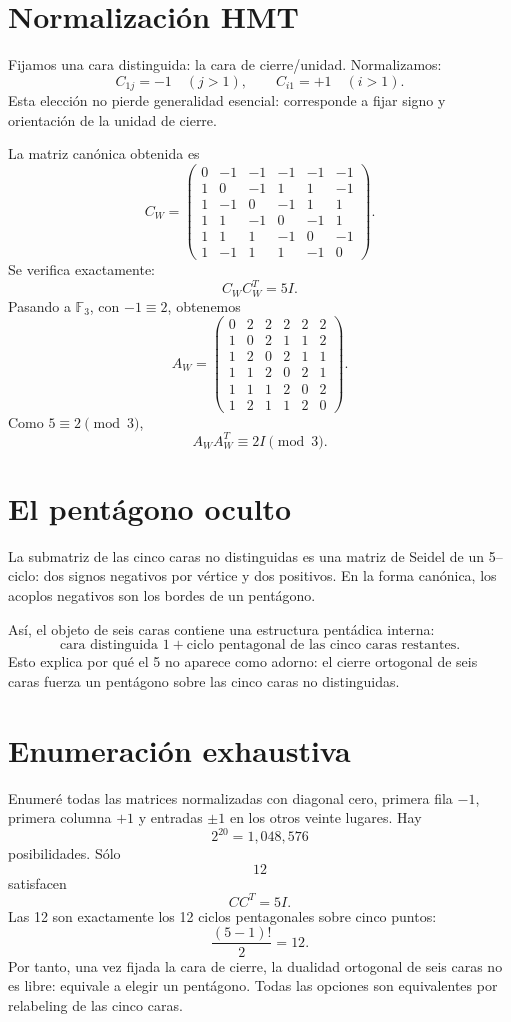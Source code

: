 \documentclass[11pt,a4paper]{article}
\newcommand{\F}{\mathbb F}
\begin{document}
\section{Normalización HMT}
Fijamos una cara distinguida: la cara de cierre/unidad. Normalizamos:
\[
C_{1j}=-1\quad(j>1),
\qquad
C_{i1}=+1\quad(i>1).
\]
Esta elección no pierde generalidad esencial: corresponde a fijar signo y orientación de la unidad de cierre.

La matriz canónica obtenida es
\[
C_W=
\begin{pmatrix}
0&-1&-1&-1&-1&-1\\
1&0&-1&1&1&-1\\
1&-1&0&-1&1&1\\
1&1&-1&0&-1&1\\
1&1&1&-1&0&-1\\
1&-1&1&1&-1&0
\end{pmatrix}.
\]
Se verifica exactamente:
\[
C_WC_W^T=5I.
\]
Pasando a \(\F_3\), con \(-1\equiv2\), obtenemos
\[
A_W=
\begin{pmatrix}
0&2&2&2&2&2\\
1&0&2&1&1&2\\
1&2&0&2&1&1\\
1&1&2&0&2&1\\
1&1&1&2&0&2\\
1&2&1&1&2&0
\end{pmatrix}.
\]
Como \(5\equiv2\pmod3\),
\[
\boxed{A_WA_W^T\equiv2I\pmod3.}
\]

\section{El pentágono oculto}
La submatriz de las cinco caras no distinguidas es una matriz de Seidel de un 5--ciclo: dos signos negativos por vértice y dos positivos. En la forma canónica, los acoplos negativos son los bordes de un pentágono.

Así, el objeto de seis caras contiene una estructura pentádica interna:
\[
\boxed{\text{cara distinguida }1 + \text{ciclo pentagonal de las cinco caras restantes}.}
\]
Esto explica por qué el 5 no aparece como adorno: el cierre ortogonal de seis caras fuerza un pentágono sobre las cinco caras no distinguidas.

\section{Enumeración exhaustiva}
Enumeré todas las matrices normalizadas con diagonal cero, primera fila \(-1\), primera columna \(+1\) y entradas \(\pm1\) en los otros veinte lugares. Hay
\[
2^{20}=1,048,576
\]
posibilidades. Sólo
\[
\boxed{12}
\]
satisfacen
\[
CC^T=5I.
\]
Las 12 son exactamente los 12 ciclos pentagonales sobre cinco puntos:
\[
\frac{(5-1)!}{2}=12.
\]
Por tanto, una vez fijada la cara de cierre, la dualidad ortogonal de seis caras no es libre: equivale a elegir un pentágono. Todas las opciones son equivalentes por relabeling de las cinco caras.
\end{document}
